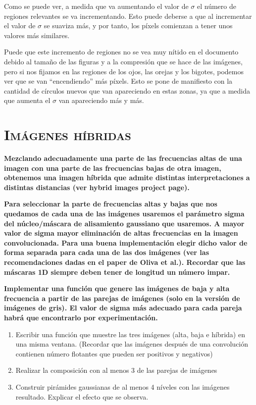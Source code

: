 \documentclass[11pt,a4paper]{article}
\begin{document}
Como se puede ver, a medida que va aumentando el valor de $\sigma$ el número de regiones relevantes se va incrementando.
Esto puede deberse a que al incrementar el valor de $\sigma$ se suaviza más, y por tanto, los píxels comienzan a tener
unos valores más similares.

Puede que este incremento de regiones no se vea muy nítido en el documento debido al tamaño de las figuras y a la compresión
que se hace de las imágenes, pero si nos fijamos en las regiones de los ojos, las orejas y los bigotes, podemos ver que se van
``encendiendo'' más píxels. Esto se pone de manifiesto con la cantidad de círculos nuevos que van apareciendo en estas zonas,
ya que a medida que aumenta el $\sigma$ van apareciendo más y más.

\newpage

\section{\textsc{Imágenes híbridas}}

\noindent \textbf{Mezclando adecuadamente una parte de las frecuencias altas de una imagen con una parte de
las frecuencias bajas de otra imagen, obtenemos una imagen híbrida que admite distintas interpretaciones a distintas
distancias (ver hybrid images project page\cite{oliva}).}

\noindent \textbf{Para seleccionar la parte de frecuencias altas y bajas que nos quedamos
de cada una de las imágenes usaremos el parámetro sigma del núcleo/máscara de alisamiento gaussiano que usaremos.
A mayor valor de sigma mayor eliminación de altas frecuencias en la imagen convolucionada. Para una buena
implementación elegir dicho valor de forma separada para cada una de las dos imágenes (ver las recomendaciones
dadas en el paper de Oliva et al.). Recordar que las máscaras 1D siempre deben tener de longitud un número impar.}

\noindent \textbf{Implementar una función que genere las imágenes de baja y alta frecuencia a partir de las
parejas de imágenes (solo en la versión de imágenes de gris). El valor de sigma más adecuado para cada pareja
habrá que encontrarlo por experimentación.}

\begin{enumerate}
	\item Escribir una función que muestre las tres imágenes (alta, baja e híbrida) en una misma ventana.
	(Recordar que las imágenes después de una convolución contienen número flotantes que pueden ser positivos y negativos)
	\item Realizar la composición con al menos 3 de las parejas de imágenes
	\item Construir pirámides gaussianas de al menos 4 níveles con las imágenes resultado. Explicar el efecto que se observa.
\end{enumerate}
\end{document}
